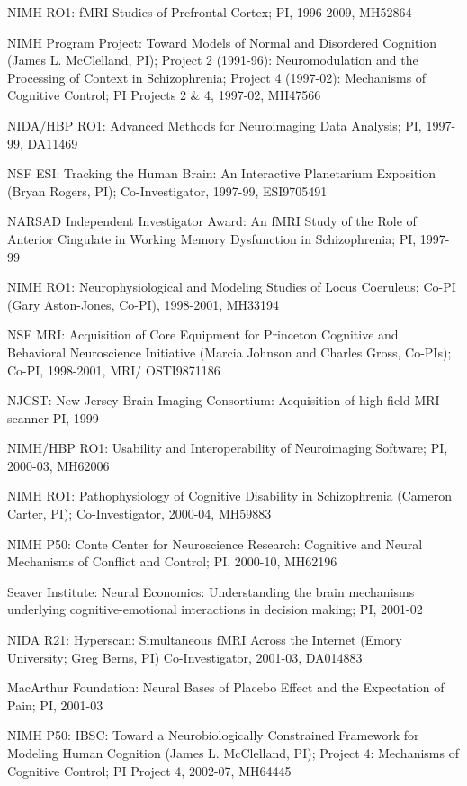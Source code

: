 \documentclass[10 pt]{article}
\begin{document}
NIMH RO1:
fMRI Studies of Prefrontal Cortex;
PI,
1996-2009,
MH52864

NIMH Program Project:
Toward Models of Normal and Disordered Cognition (James L. McClelland, PI);
Project 2 (1991-96): Neuromodulation and the Processing of Context in Schizophrenia;
Project 4 (1997-02): Mechanisms of Cognitive Control;
PI Projects 2 \& 4,
1997-02,
MH47566

NIDA/HBP RO1:
Advanced Methods for Neuroimaging Data Analysis;
PI,
1997-99,
DA11469

NSF ESI:
Tracking the Human Brain: An Interactive Planetarium Exposition (Bryan Rogers, PI);
Co-Investigator,
1997-99,
ESI9705491

NARSAD Independent Investigator Award:
An fMRI Study of the Role of Anterior Cingulate in Working Memory Dysfunction in Schizophrenia;
PI,
1997-99

NIMH RO1:
Neurophysiological and Modeling Studies of Locus Coeruleus;
Co-PI (Gary Aston-Jones, Co-PI),
1998-2001,
MH33194

NSF MRI:
Acquisition of Core Equipment for Princeton Cognitive and Behavioral Neuroscience Initiative (Marcia Johnson and
Charles Gross, Co-PIs);
Co-PI,
1998-2001,
MRI/ OSTI9871186

NJCST:
New Jersey Brain Imaging Consortium: Acquisition of high field MRI scanner
PI,
1999

NIMH/HBP RO1:
Usability and Interoperability of Neuroimaging Software;
PI,
2000-03,
MH62006

NIMH RO1:
Pathophysiology of Cognitive Disability in Schizophrenia (Cameron Carter, PI);
Co-Investigator,
2000-04,
MH59883

NIMH P50:
Conte Center for Neuroscience Research: Cognitive and Neural Mechanisms of Conflict and Control;
PI,
2000-10,
MH62196

Seaver Institute:
Neural Economics: Understanding the brain mechanisms underlying cognitive-emotional interactions in decision making;
PI,
2001-02

NIDA R21:
Hyperscan: Simultaneous fMRI Across the Internet (Emory University; Greg Berns, PI)
Co-Investigator,
2001-03,
DA014883

MacArthur Foundation:
Neural Bases of Placebo Effect and the Expectation of Pain;
PI,
2001-03

NIMH P50:
IBSC: Toward a Neurobiologically Constrained Framework for Modeling Human Cognition (James L. McClelland, PI);
Project 4: Mechanisms of Cognitive Control;
PI Project 4,
2002-07,
MH64445
\end{document}
